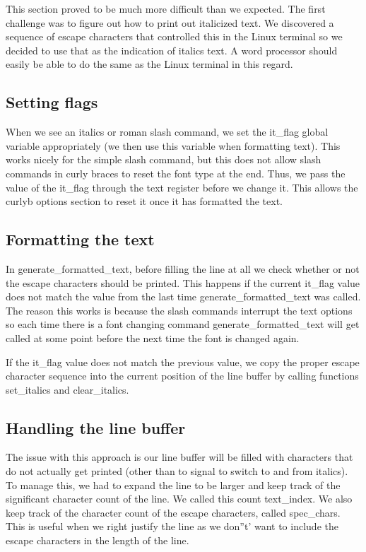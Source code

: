 This section proved to be much more difficult than we expected. The first challenge
was to figure out how to print out italicized text. We discovered a sequence of
escape characters that controlled this in the Linux terminal so we decided to use that
as the indication of italics text. A word processor should easily be able to do the same
as the Linux terminal in this regard.

\subsection{Setting flags}
When we see an italics or roman slash command, we set the it_flag global variable 
appropriately (we then use this variable when formatting text). This works nicely
for the simple slash command, but this does not allow slash commands in curly braces
to reset the font type at the end. Thus, we pass the value of the it_flag through the text register before
we change it. This allows the curlyb options section to reset it once it has formatted the
text.

\subsection{Formatting the text}
In generate_formatted_text, before filling the line at all we check whether or not the 
escape characters should be printed. This happens if the current it_flag value does not
match the value from the last time generate_formatted_text was called. The reason this works is because the slash commands interrupt the text options so each time there is a 
font changing command generate_formatted_text will get called at some point before the next 
time the font is changed again.

If the it_flag value does not match the previous value, we copy the proper escape character
sequence into the current position of the line buffer by calling functions set_italics and 
clear_italics.

\subsection{Handling the line buffer}
The issue with this approach is our line buffer will be filled with characters that do not
actually get printed (other than to signal to switch to and from italics). To manage this,
we had to expand the line to be larger and keep track of the significant character count
of the line. We called this count text_index. We also keep track of the character count
of the escape characters, called spec_chars. This is useful when we right justify the line
as we don''t' want to include the escape characters in the length of the line.

